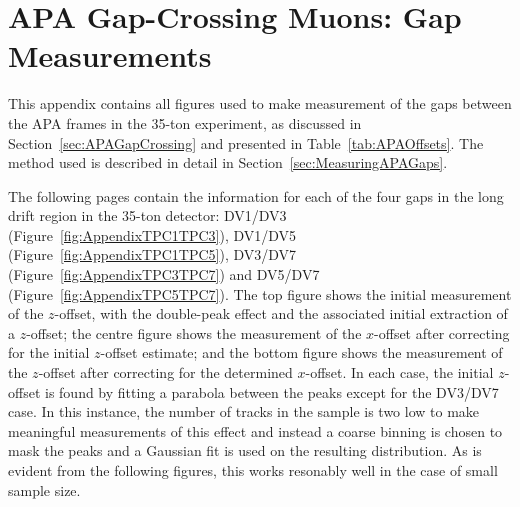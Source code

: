 
\graphicspath{{AppendixAPAGap/Figs/}}

\chapter{APA Gap-Crossing Muons: Gap Measurements}\label{appen:APAGap}

This appendix contains all figures used to make measurement of the gaps between the APA frames in the 35-ton experiment, as discussed in Section~\ref{sec:APAGapCrossing} and presented in Table~\ref{tab:APAOffsets}.  The method used is described in detail in Section~\ref{sec:MeasuringAPAGaps}.

The following pages contain the information for each of the four gaps in the long drift region in the 35-ton detector: DV1/DV3 (Figure~\ref{fig:AppendixTPC1TPC3}), DV1/DV5 (Figure~\ref{fig:AppendixTPC1TPC5}), DV3/DV7 (Figure~\ref{fig:AppendixTPC3TPC7}) and DV5/DV7 (Figure~\ref{fig:AppendixTPC5TPC7}).  The top figure shows the initial measurement of the $z$-offset, with the double-peak effect and the associated initial extraction of a $z$-offset; the centre figure shows the measurement of the $x$-offset after correcting for the initial $z$-offset estimate; and the bottom figure shows the measurement of the $z$-offset after correcting for the determined $x$-offset.  In each case, the initial $z$-offset is found by fitting a parabola between the peaks except for the DV3/DV7 case.  In this instance, the number of tracks in the sample is two low to make meaningful measurements of this effect and instead a coarse binning is chosen to mask the peaks and a Gaussian fit is used on the resulting distribution.  As is evident from the following figures, this works resonably well in the case of small sample size.

